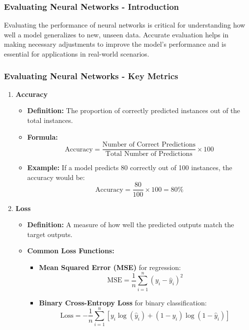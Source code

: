 \documentclass[aspectratio=169]{beamer}
\begin{document}
\begin{frame}[fragile]
    \frametitle{Evaluating Neural Networks - Introduction}
    Evaluating the performance of neural networks is critical for understanding how well a model generalizes to new, unseen data. 
    Accurate evaluation helps in making necessary adjustments to improve the model's performance and is essential for applications in real-world scenarios.
\end{frame}

\begin{frame}[fragile]
    \frametitle{Evaluating Neural Networks - Key Metrics}
    \begin{enumerate}
        \item \textbf{Accuracy}
        \begin{itemize}
            \item \textbf{Definition:} The proportion of correctly predicted instances out of the total instances.
            \item \textbf{Formula:}
            \begin{equation}
            \text{Accuracy} = \frac{\text{Number of Correct Predictions}}{\text{Total Number of Predictions}} \times 100
            \end{equation}
            \item \textbf{Example:} If a model predicts 80 correctly out of 100 instances, the accuracy would be: 
            \begin{equation}
            \text{Accuracy} = \frac{80}{100} \times 100 = 80\%
            \end{equation}
        \end{itemize}
        
        \item \textbf{Loss}
        \begin{itemize}
            \item \textbf{Definition:} A measure of how well the predicted outputs match the target outputs. 
            \item \textbf{Common Loss Functions:}
            \begin{itemize}
                \item \textbf{Mean Squared Error (MSE)} for regression:
                \begin{equation}
                \text{MSE} = \frac{1}{n} \sum_{i=1}^{n}(y_i - \hat{y}_i)^2
                \end{equation}
                \item \textbf{Binary Cross-Entropy Loss} for binary classification:
                \begin{equation}
                \text{Loss} = -\frac{1}{n} \sum_{i=1}^{n} \left[y_i \log(\hat{y}_i) + (1 - y_i) \log(1 - \hat{y}_i)\right]
                \end{equation}
            \end{itemize}
        \end{itemize}
    \end{enumerate}
\end{frame}
\end{document}
